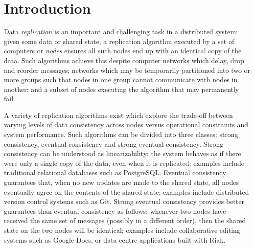 \documentclass[acmlarge,review,anonymous]{acmart}\settopmatter{printfolios=true}
\begin{document}


\maketitle



\section{Introduction}
\label{sect.introduction}

Data \emph{replication} is an important and challenging task in a distributed system: given some data or shared state, a replication algorithm executed by a set of computers or \emph{nodes} ensures all such nodes end up with an identical copy of the data.
Such algorithms achieve this despite computer networks which delay, drop and reorder messages; networks which may be temporarily partitioned into two or more groups such that nodes in one group cannot communicate with nodes in another; and a subset of nodes executing the algorithm that may permanently fail.

A variety of replication algorithms exist which explore the trade-off between varying levels of data consistency across nodes versus operational constraints and system performance.
Such algorithms can be divided into three classes: strong consistency, eventual consistency and strong eventual consistency.
Strong consistency can be understood as linearizability: the system behaves as if there were only a single copy of the data, even when it is replicated; examples include traditional relational databases such as PostgreSQL.
Eventual consistency guarantees that, when no new updates are made to the shared state, all nodes eventually agree on the contents of the shared state; examples include distributed version control systems such as Git.
Strong eventual consistency provides better guarantees than eventual consistency as follows: whenever two nodes have received the same set of messages (possibly in a different order), then the shared state on the two nodes will be identical; examples include collaborative editing systems such as Google Docs, or data centre applications built with Riak.
\end{document}
